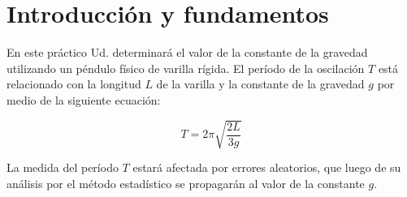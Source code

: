 \section{Introducción y fundamentos}

En este práctico Ud. determinará el valor de la constante de la gravedad
utilizando un péndulo físico de varilla rígida. El período de la oscilación $T$
está relacionado con la longitud $L$ de la varilla y la constante de la
gravedad $g$ por medio de la siguiente ecuación:

\begin{equation}
    \label{ec:intro:periodo}
    T = 2\pi \sqrt{ \frac{2L}{3g} }
\end{equation}

La medida del período $T$ estará afectada por errores aleatorios, que luego 
de su análisis por el método estadístico se propagarán al valor de la
constante $g$.
